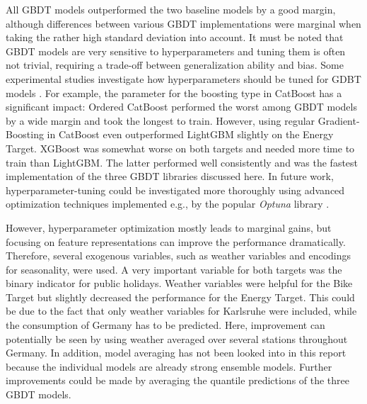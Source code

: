 All GBDT models outperformed the two baseline models by a good margin, although differences between various GBDT implementations were marginal when taking the rather high standard deviation into account. It must be noted that GBDT models are very sensitive to hyperparameters and tuning them is often not trivial, requiring a trade-off between generalization ability and bias. Some experimental studies investigate how hyperparameters should be tuned for GDBT models \parencites{florek_benchmarking_2023, bentejac_comparative_2021}. For example, the parameter for the boosting type in CatBoost has a significant impact: Ordered CatBoost performed the worst among GBDT models by a wide margin and took the longest to train. However, using regular Gradient-Boosting in CatBoost even outperformed LightGBM slightly on the Energy Target. XGBoost was somewhat worse on both targets and needed more time to train than LightGBM. The latter performed well consistently and was the fastest implementation of the three GBDT libraries discussed here. In future work, hyperparameter-tuning could be investigated more thoroughly using advanced optimization techniques implemented e.g., by the popular \textit{Optuna} library \parencite{akiba_optuna_2019}.

However, hyperparameter optimization mostly leads to marginal gains, but focusing on feature representations can improve the performance dramatically. Therefore, several exogenous variables, such as weather variables and encodings for seasonality, were used. A very important variable for both targets was the binary indicator for public holidays. Weather variables were helpful for the Bike Target but slightly decreased the performance for the Energy Target. This could be due to the fact that only weather variables for Karlsruhe were included, while the consumption of Germany has to be predicted. Here, improvement can potentially be seen by using weather averaged over several stations throughout Germany. In addition, model averaging has not been looked into in this report because the individual models are already strong ensemble models. Further improvements could be made by averaging the quantile predictions of the three GBDT models.


